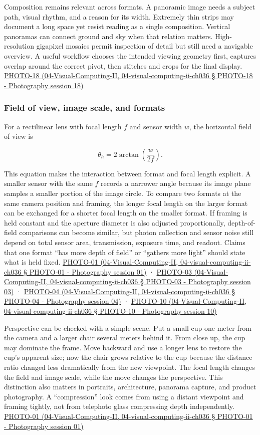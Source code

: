 Composition remains relevant across formats. A panoramic image needs a subject path, visual rhythm, and a reason for its width. Extremely thin strips may document a long space yet resist reading as a single composition. Vertical panoramas can connect ground and sky when that relation matters. High-resolution gigapixel mosaics permit inspection of detail but still need a navigable overview. A useful workflow chooses the intended viewing geometry first, captures overlap around the correct pivot, then stitches and crops for the final display. \href{}{PHOTO-18 (04-Visual-Computing-II, 04-visual-computing-ii-ch036 § PHOTO-18 - Photography session 18)}

\subsubsection{Field of view, image scale, and formats}\label{field-of-view-image-scale-and-formats}

For a rectilinear lens with focal length \(f\) and sensor width \(w\), the horizontal field of view is

\[
\theta_h=2\arctan\left(\frac{w}{2f}\right).
\]

This equation makes the interaction between format and focal length explicit. A smaller sensor with the same \(f\) records a narrower angle because its image plane samples a smaller portion of the image circle. To compare two formats at the same camera position and framing, the longer focal length on the larger format can be exchanged for a shorter focal length on the smaller format. If framing is held constant and the aperture diameter is also adjusted proportionally, depth-of-field comparisons can become similar, but photon collection and sensor noise still depend on total sensor area, transmission, exposure time, and readout. Claims that one format ``has more depth of field'' or ``gathers more light'' should state what is held fixed. \href{}{PHOTO-01 (04-Visual-Computing-II, 04-visual-computing-ii-ch036 § PHOTO-01 - Photography session 01)} · \href{}{PHOTO-03 (04-Visual-Computing-II, 04-visual-computing-ii-ch036 § PHOTO-03 - Photography session 03)} · \href{}{PHOTO-04 (04-Visual-Computing-II, 04-visual-computing-ii-ch036 § PHOTO-04 - Photography session 04)} · \href{}{PHOTO-10 (04-Visual-Computing-II, 04-visual-computing-ii-ch036 § PHOTO-10 - Photography session 10)}

Perspective can be checked with a simple scene. Put a small cup one meter from the camera and a larger chair several meters behind it. From close up, the cup may dominate the frame. Move backward and use a longer lens to restore the cup's apparent size; now the chair grows relative to the cup because the distance ratio changed less dramatically from the new viewpoint. The focal length changes the field and image scale, while the move changes the perspective. This distinction also matters in portraits, architecture, panorama capture, and product photography. A ``compression'' look comes from using a distant viewpoint and framing tightly, not from telephoto glass compressing depth independently. \href{}{PHOTO-01 (04-Visual-Computing-II, 04-visual-computing-ii-ch036 § PHOTO-01 - Photography session 01)}

